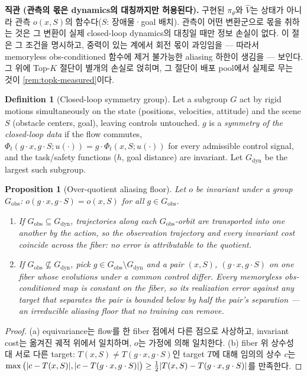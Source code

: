\documentclass[11pt]{article}
\theoremstyle{plain}
\newtheorem{proposition}[theorem]{Proposition}
\theoremstyle{definition}
\newtheorem{definition}[theorem]{Definition}
\theoremstyle{remark}
\DeclarePairedDelimiter{\abs}{\lvert}{\rvert}
\newcommand{\Vhat}{\widehat V}
\begin{document}
\textbf{직관 (관측의 몫은 dynamics의 대칭까지만 허용된다).}
구현된 $\pi_\theta$와 $\Vhat$는 상태가 아니라 관측 $o(x,S)$의 함수다($S$: 장애물·goal 배치).
관측이 어떤 변환군으로 몫을 취하는 것은 그 변환이 실제 closed-loop dynamics의 대칭일 때만 정보
손실이 없다. 이 절은 그 조건을 명시하고, 중력이 있는 계에서 회전 몫이 과잉임을 --- 따라서
memoryless obs-conditioned 함수에 제거 불가능한 aliasing 하한이 생김을 --- 보인다. 그 위에
Top-$K$ 절단이 별개의 손실로 얹히며, 그 절단이 배포 pool에서 실제로 무는 것이
\cref{rem:topk-measured}이다.

\begin{definition}[Closed-loop symmetry group]\label{def:sym}
Let a subgroup $G$ act by rigid motions simultaneously on the state (positions, velocities,
attitude) and the scene $S$ (obstacle centers, goal), leaving controls untouched. $g$ is a
\emph{symmetry of the closed-loop data} if the flow commutes,
$\Phi_t(g\cdot x, g\cdot S; u(\cdot)) = g\cdot \Phi_t(x, S; u(\cdot))$ for every admissible
control signal, and the task/safety functions ($h$, goal distance) are invariant. Let
$G_{\mathrm{dyn}}$ be the largest such subgroup.
\end{definition}

\begin{proposition}[Over-quotient aliasing floor]\label{prop:obs}
Let $o$ be invariant under a group $G_{\mathrm{obs}}$: $o(g\cdot x, g\cdot S)=o(x,S)$ for all
$g\in G_{\mathrm{obs}}$.
\begin{enumerate}[label=(\alph*)]
  \item If $G_{\mathrm{obs}}\subseteq G_{\mathrm{dyn}}$, trajectories along each
  $G_{\mathrm{obs}}$-orbit are transported into one another by the action, so the observation
  trajectory and every invariant cost coincide across the fiber: no error is attributable to
  the quotient.
  \item If $G_{\mathrm{obs}}\not\subseteq G_{\mathrm{dyn}}$, pick
  $g\in G_{\mathrm{obs}}\setminus G_{\mathrm{dyn}}$ and a pair $(x,S)$, $(g\cdot x, g\cdot S)$
  on one fiber whose evolutions under a common control differ. Every memoryless
  obs-conditioned map is constant on the fiber, so its realization error against any target
  that separates the pair is bounded below by half the pair's separation --- an
  \emph{irreducible aliasing floor} that no training can remove.
\end{enumerate}
\end{proposition}
\begin{proof}
(a) equivariance는 flow를 한 fiber 점에서 다른 점으로 사상하고, invariant cost는 옮겨진 궤적
위에서 일치하며, $o$는 가정에 의해 일치한다. (b) fiber 위 상수성 대 서로 다른 target:
$T(x,S)\neq T(g\cdot x, g\cdot S)$인 target $T$에 대해 임의의 상수 $c$는
$\max\big(\abs{c-T(x,S)}, \abs{c-T(g\cdot x,g\cdot S)}\big)\ge
\tfrac12\abs{T(x,S)-T(g\cdot x,g\cdot S)}$를 만족한다.
\end{proof}
\end{document}
